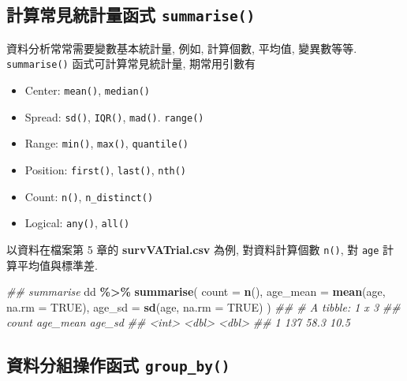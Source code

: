 \documentclass[
]{book}
\newenvironment{Shaded}{\begin{snugshade}}{\end{snugshade}}
\newcommand{\CommentTok}[1]{\textcolor[rgb]{0.56,0.35,0.01}{\textit{#1}}}
\newcommand{\DataTypeTok}[1]{\textcolor[rgb]{0.13,0.29,0.53}{#1}}
\newcommand{\KeywordTok}[1]{\textcolor[rgb]{0.13,0.29,0.53}{\textbf{#1}}}
\newcommand{\NormalTok}[1]{#1}
\newcommand{\OperatorTok}[1]{\textcolor[rgb]{0.81,0.36,0.00}{\textbf{#1}}}
\newcommand{\OtherTok}[1]{\textcolor[rgb]{0.56,0.35,0.01}{#1}}
\newcommand{\StringTok}[1]{\textcolor[rgb]{0.31,0.60,0.02}{#1}}
\providecommand{\tightlist}{%
  \setlength{\itemsep}{0pt}\setlength{\parskip}{0pt}}
\begin{document}
\hypertarget{ux8a08ux7b97ux5e38ux898bux7d71ux8a08ux91cfux51fdux5f0f-summarise}{%
\subsection{\texorpdfstring{計算常見統計量函式 \texttt{summarise()}}{計算常見統計量函式 summarise()}}\label{ux8a08ux7b97ux5e38ux898bux7d71ux8a08ux91cfux51fdux5f0f-summarise}}

資料分析常常需要變數基本統計量,
例如, 計算個數, 平均值, 變異數等等.
\texttt{summarise()} 函式可計算常見統計量,
期常用引數有

\begin{itemize}
\tightlist
\item
  Center: \texttt{mean()}, \texttt{median()}
\item
  Spread: \texttt{sd()}, \texttt{IQR()}, \texttt{mad()}. \texttt{range()}
\item
  Range: \texttt{min()}, \texttt{max()}, \texttt{quantile()}
\item
  Position: \texttt{first()}, \texttt{last()}, \texttt{nth()}
\item
  Count: \texttt{n()}, \texttt{n\_distinct()}
\item
  Logical: \texttt{any()}, \texttt{all()}
\end{itemize}

以資料在檔案第 5 章的 \textbf{survVATrial.csv} 為例,
對資料計算個數 \texttt{n()},
對 \texttt{age} 計算平均值與標準差.

\begin{Shaded}
\begin{Highlighting}[]
\CommentTok{\#\# summarise}
\NormalTok{dd }\OperatorTok{\%\textgreater{}\%}\StringTok{ }
\StringTok{  }\KeywordTok{summarise}\NormalTok{(}
    \DataTypeTok{count =} \KeywordTok{n}\NormalTok{(),}
    \DataTypeTok{age\_mean =} \KeywordTok{mean}\NormalTok{(age, }\DataTypeTok{na.rm =} \OtherTok{TRUE}\NormalTok{),}
    \DataTypeTok{age\_sd =} \KeywordTok{sd}\NormalTok{(age, }\DataTypeTok{na.rm =} \OtherTok{TRUE}\NormalTok{)}
\NormalTok{    )}
\CommentTok{\#\# \# A tibble: 1 x 3}
\CommentTok{\#\#   count age\_mean age\_sd}
\CommentTok{\#\#   \textless{}int\textgreater{}    \textless{}dbl\textgreater{}  \textless{}dbl\textgreater{}}
\CommentTok{\#\# 1   137     58.3   10.5}
\end{Highlighting}
\end{Shaded}

\hypertarget{ux8cc7ux6599ux5206ux7d44ux64cdux4f5cux51fdux5f0f-group_by}{%
\subsection{\texorpdfstring{資料分組操作函式 \texttt{group\_by()}}{資料分組操作函式 group\_by()}}\label{ux8cc7ux6599ux5206ux7d44ux64cdux4f5cux51fdux5f0f-group_by}}
\end{document}
